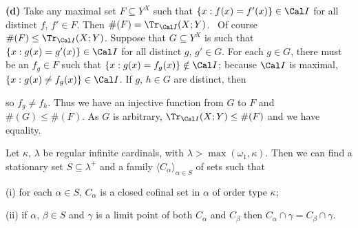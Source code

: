 {\medskip

{\bf (d)} Take any maximal set $F\subseteq Y^X$ such that
$\{x:f(x)=f'(x)\}\in\Cal I$ for all distinct $f$, $f'\in F$.   Then
$\#(F)=\Tr_{\Cal I}(X;Y)$.   \Prf\ Of course $\#(F)\le\Tr_{\Cal I}(X;Y)$.
Suppose that $G\subseteq Y^X$ is such that
$\{x:g(x)=g'(x)\}\in\Cal I$ for all distinct $g$, $g'\in G$.   For each
$g\in G$, there must be an $f_g\in F$ such that
$\{x:g(x)=f_g(x)\}\notin\Cal I$;  because $\Cal I$ is maximal,
$\{x:g(x)\ne f_g(x)\}\in\Cal I$.   If $g$, $h\in G$ are distinct,
then


\noindent so $f_g\ne f_h$.   Thus we have an injective function from $G$ to
$F$ and $\#(G)\le\#(F)$.   As $G$ is arbitrary,
$\Tr_{\Cal I}(X;Y)\le\#(F)$ and we have equality.\ \Qed
}%

Let $\kappa$, $\lambda$ be regular infinite cardinals, with
$\lambda>\max(\omega_1,\kappa)$.
Then we can find a stationary set $S\subseteq\lambda^+$ and a family
$\langle C_{\alpha}\rangle_{\alpha\in S}$ of sets such that

(i) for each $\alpha\in S$, $C_{\alpha}$ is a closed cofinal set in
$\alpha$ of order type $\kappa$;

(ii) if $\alpha$, $\beta\in S$ and $\gamma$ is a limit
point of both $C_{\alpha}$ and $C_{\beta}$ then
$C_{\alpha}\cap\gamma=C_{\beta}\cap\gamma$.

